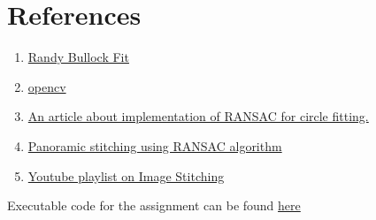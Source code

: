 \section*{References}
\begin{enumerate}
    \item \href{https://dtcenter.org/sites/default/files/community-code/met/docs/write-ups/circle_fit.pdf}{Randy Bullock Fit}
    \item \href{https://docs.opencv.org/4.x/}{opencv}
    \item \href{https://sdg002.github.io/ransac-circle/index.html}{An article about implementation of RANSAC for circle fitting.}
    \item \href{https://programmer.group/panoramic-stitching-using-ransac-algorithm.html}{Panoramic stitching using RANSAC algorithm}
    \item \href{https://youtu.be/J1DwQzab6Jg}{Youtube playlist on Image Stitching}
\end{enumerate}
\vspace*{.8cm}
\HRule
\vspace*{-.2cm}
\begin{center}
    Executable code for the assignment can be found \href{https://github.com/sanjith1999/EN2550-Assignments/tree/master/Fitting%20and%20Alignment}{here}
\end{center}